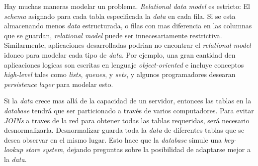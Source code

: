 Hay muchas maneras modelar un problema. \textit{Relational data model} es estricto: El \textit{schema} asignado para cada tabla especificada la \textit{data} en cada fila. Si se esta almacenando menos \textit{data} estructurada, o filas con mas diferencia en las columnas que se guardan, \textit{relational model} puede ser innecesariamente restrictiva. Similarmente, aplicaciones desarrolladas podrian no encontrar el \textit{relational model} idoneo para modelar cada tipo de \textit{data}. Por ejemplo, una gran cantidad den aplicaciones logicas son escritas en lenguaje \textit{object-oriented} e incluye conceptos \textit{high-level} tales como \textit{lists}, \textit{queues}, y \textit{sets}, y algunos programadores desearan \textit{persistence layer} para modelar esto.

Si la \textit{data} crece mas allá de la capacidad de un servidor, entonces las tablas en la \textit{database} tendrá que ser particionado a través de varios computadores. Para evitar \textit{JOINs} a traves de la red para obtener todas las tablas requeridas, será necesario desnormalizarla. Desnormalizar guarda toda la \textit{data} de diferentes tablas que se desea observar en el mismo lugar. Esto hace que la \textit{database} simule una \textit{key-lookup store system}, dejando preguntas sobre la posibilidad de adaptarse mejor a la \textit{data}.

